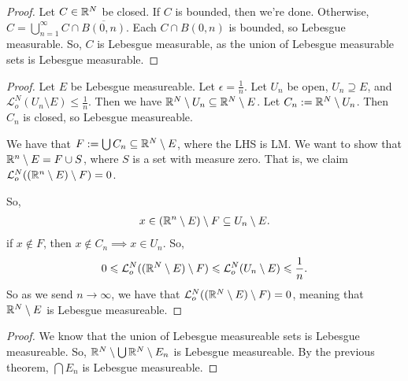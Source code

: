 \documentclass{report}
\begin{document}
\newpage
{}
\begin{proof}
    Let $C \in \RR^N$ be closed. If $C$ is bounded, then we're done. Otherwise, $C = \bigcup_{n=1}^\infty C \cap \overline{B(0, n)}$. Each $C \cap B(0, n)$ is bounded, so Lebesgue measurable. So, $C$ is Lebesgue measurable, as the union of Lebesgue measurable sets is Lebesgue measurable.
\end{proof}
\begin{proof}
    Let $E$ be Lebesgue measureable. Let $\epsilon = \frac 1n$. Let $U_n$ be open, $U_n \supseteq E$, and $\mathcal L_o^N(U_n \setminus E) \leq \frac 1n$. Then we have $\RR^N \setminus U_n \subseteq \RR^N \setminus E$. Let $C_n := \RR^N \setminus U_n$. Then $C_n$ is closed, so Lebesgue measureable. 

    We have that $F := \bigcup C_n \subseteq \RR^N \setminus E$, where the LHS is LM. We want to show that $\RR^n \setminus E = F \cup S$, where $S$ is a set with measure zero. That is, we claim $\mathcal L_o^N((\RR^n \setminus E) \setminus F) = 0$.

    So,
    \begin{align*}
        x \in (\RR^n \setminus E) \setminus F \subseteq U_n \setminus E.
    \end{align*}
    if $x \notin F$, then $x \notin C_n \implies x \in U_n$. So,
    \begin{align*}
        0 \leq \mathcal L_o^N((\RR^N \setminus E) \setminus F) \leq \mathcal L_o^N(U_n \setminus E) \leq \frac 1n.
    \end{align*}
    So as we send $n \to \infty$, we have that $\mathcal L_o^N((\RR^N \setminus E) \setminus F) = 0$, meaning that $\RR^N \setminus E$ is Lebesgue measureable.
\end{proof}
\begin{proof}
    We know that the union of Lebesgue measureable sets is Lebesgue measureable. So, $\RR^N \setminus \bigcup \RR^N \setminus E_n$ is Lebesgue measureable. By the previous theorem, $\bigcap E_n$ is Lebesgue measureable.
\end{proof}
\newpage
{}
\end{document}

